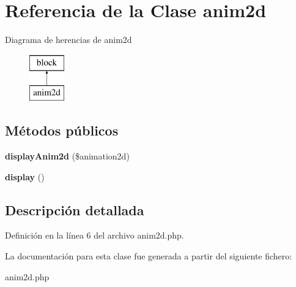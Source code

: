 \hypertarget{classanim2d}{\section{\-Referencia de la \-Clase anim2d}
\label{classanim2d}
}
\-Diagrama de herencias de anim2d\begin{figure}[H]
\begin{center}
\leavevmode
\includegraphics[height=2.000000cm]{classanim2d}
\end{center}
\end{figure}
\subsection*{\-Métodos públicos}
\begin{DoxyCompactItemize}
\item 
\hypertarget{classanim2d_a790ab010b1ab2211bf6fcbd8312b311c}{{\bfseries display\-Anim2d} (\$animation2d)}\label{classanim2d_a790ab010b1ab2211bf6fcbd8312b311c}

\item 
\hypertarget{classanim2d_ac75636f962552bb25edd7e31e8c8a07c}{{\bfseries display} ()}\label{classanim2d_ac75636f962552bb25edd7e31e8c8a07c}

\end{DoxyCompactItemize}


\subsection{\-Descripción detallada}


\-Definición en la línea 6 del archivo anim2d.\-php.



\-La documentación para esta clase fue generada a partir del siguiente fichero\-:\begin{DoxyCompactItemize}
\item 
anim2d.\-php\end{DoxyCompactItemize}
